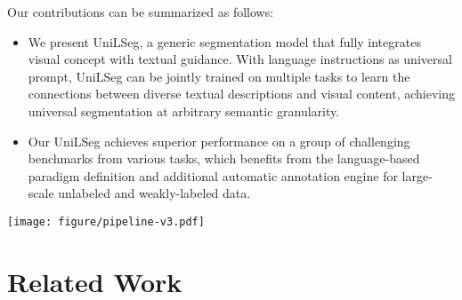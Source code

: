 \documentclass[10pt,twocolumn,letterpaper]{article}
\newcommand{\MethodName}{UniLSeg\xspace}
\begin{document}
 
 
 
  





Our contributions can be summarized as follows:
\begin{itemize}
\item We present \MethodName, a generic segmentation model that fully integrates visual concept with textual guidance. With language instructions as universal prompt, \MethodName can be jointly trained on multiple tasks to learn the connections between diverse textual descriptions and visual content, achieving universal segmentation at arbitrary semantic granularity.
    \item Our \MethodName achieves superior performance on a group of challenging benchmarks from various tasks, which benefits from the language-based paradigm definition and additional automatic annotation engine for large-scale unlabeled and weakly-labeled data.
\end{itemize}



\begin{figure*}[t]
    \centering
    \texttt{[image: figure/pipeline-v3.pdf]}
    \vspace{-10pt}
    \caption{Pipeline of our \MethodName. It takes both images and corresponding language prompt as input.
    With versatile language descriptions indicating segmentation targets and full visual-linguistic interactions, \MethodName can perform segmentation at any semantic granularity and tackle various tasks such as semantic segmentation (SS), part segmentation (PS), salient object detection (SOD), open-vocabulary segmentation (OVS), referring image (RIS) and video object segmentation (RVOS).}
    \label{fig:pipeline}
    \vspace{-10pt}
\end{figure*}

\vspace{-7pt}
\section{Related Work}
\vspace{-3pt}
\end{document}
